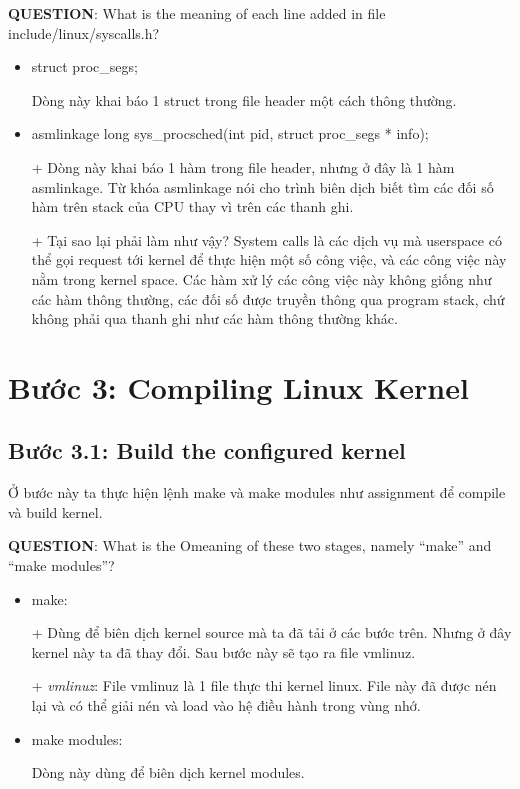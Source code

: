 \vspace{0.3cm}


\textbf{QUESTION}:  What is the meaning of each line added in file include/linux/syscalls.h?

\begin{itemize}
	\item struct proc\_segs;
	
Dòng này khai báo 1 struct trong file header một cách thông thường.
	
	\item asmlinkage long sys\_procsched(int pid, struct proc\_segs * info);

	+ Dòng này khai báo 1 hàm trong file header, nhưng ở đây là 1 hàm asmlinkage. Từ khóa asmlinkage nói cho trình biên dịch biết tìm các đối số hàm trên stack của CPU thay vì trên các thanh ghi.
	
	+ Tại sao lại phải làm như vậy? System calls là các dịch vụ mà userspace có thể gọi request tới kernel để thực hiện một số công việc, và các công việc này nằm trong kernel space. Các hàm xử lý các công việc này không giống như các hàm thông thường, các đối số được truyền thông qua program stack, chứ không phải qua thanh ghi như các hàm thông thường khác.
\end{itemize}
 

\section{Bước 3: Compiling Linux Kernel}

\subsection{Bước 3.1: Build the configured kernel}

Ở bước này ta thực hiện lệnh make và make modules như assignment để compile và build kernel.

\vspace{0.2cm}

\textbf{QUESTION}: What is the Omeaning of these two stages, namely “make” and “make modules”?

\begin{itemize}
	\item make:
	
	+ Dùng để biên dịch kernel source mà ta đã tải ở các bước trên. Nhưng ở đây kernel này ta đã thay đổi. Sau bước này sẽ tạo ra file vmlinuz.
	
	+ \textit{vmlinuz}: File vmlinuz là 1 file thực thi kernel linux. File này đã được nén lại và có thể giải nén và load vào hệ điều hành trong vùng nhớ.
	
	\item make modules:
	
	Dòng này dùng để biên dịch kernel modules.
\end{itemize}


